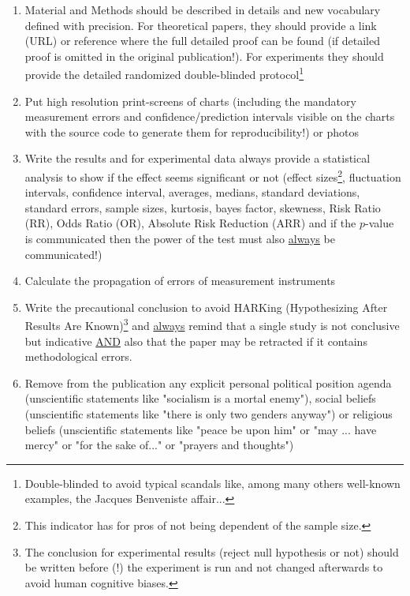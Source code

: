 \begin{enumerate}[label=\protect\circledbullet{\arabic*},leftmargin=15mm]
		\item Material and Methods should be described in details and new vocabulary defined with precision. For theoretical papers, they should provide a link (URL) or reference where the full detailed proof can be found (if detailed proof is omitted in the original publication!). For experiments they should provide the detailed randomized double-blinded protocol\footnote{Double-blinded to avoid typical scandals like, among many others well-known examples, the Jacques Benveniste affair...}
		
		\item Put high resolution print-screens of charts (including the mandatory measurement errors and confidence/prediction intervals visible on the charts with the source code to generate them for reproducibility!) or photos
		
		\item Write the results and for experimental data always provide a statistical analysis to show if the effect seems significant or not (effect sizes\footnote{This indicator has for pros of not being dependent of the sample size.}, fluctuation intervals, confidence interval, averages, medians, standard deviations, standard errors, sample sizes, kurtosis, bayes factor, skewness, Risk Ratio (RR), Odds Ratio (OR), Absolute Risk Reduction (ARR) and if the $p$-value is communicated then the power of the test must also \underline{always} be communicated!)
		
		\item Calculate the propagation of errors of measurement instruments
		
		\item Write the precautional conclusion to avoid HARKing (Hypothesizing After Results Are Known)\footnote{The conclusion for experimental results (reject null hypothesis or not) should be written before (!) the experiment is run and not changed afterwards to avoid human cognitive biases.} and  \underline{always} remind that a single study is not conclusive but indicative \underline{AND} also that the paper may be retracted if it contains methodological errors.
		
		\item Remove from the publication any explicit personal political position agenda (unscientific statements like "socialism is a mortal enemy"), social beliefs (unscientific statements like "there is only two genders anyway") or religious beliefs (unscientific statements like "peace be upon him" or "may ... have mercy" or "for the sake of..." or "prayers and thoughts")
		

\end{enumerate}
